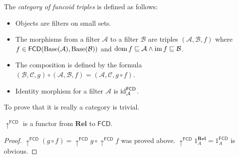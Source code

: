 The \emph{category of funcoid
triples} is defined as follows:
\begin{itemize}
\item Objects are filters on small sets.
\item The morphisms from a filter $\mathcal{A}$ to a filter $\mathcal{B}$
are triples $(\mathcal{A},\mathcal{B},f)$ where
$f\in\mathsf{FCD}(\operatorname{Base}(\mathcal{A}),\operatorname{Base}(\mathcal{B}))$
and $\operatorname{dom} f\sqsubseteq\mathcal{A}\land\operatorname{im} f\sqsubseteq\mathcal{B}$.
\item The composition is defined by the formula
$(\mathcal{B},\mathcal{C},g)\circ(\mathcal{A},\mathcal{B},f)=(\mathcal{A}
,\mathcal{C},g\circ f)$.
\item Identity morphism for a filter $\mathcal{A}$ is
$\operatorname{id}_{\mathcal{A}}^{\mathsf{FCD}}$.
\end{itemize}
To prove that it is really a category is trivial.
\begin{prop}
$\uparrow^{\mathsf{FCD}}$ is a functor from $\mathbf{Rel}$ to
$\mathsf{FCD}$.\end{prop}
\begin{proof}
$\uparrow^{\mathsf{FCD}}(g\circ
f)=\uparrow^{\mathsf{FCD}}g\circ\uparrow^{\mathsf{FCD}}f$
was proved above.
$\uparrow^{\mathsf{FCD}}1_{A}^{\mathbf{Rel}}=1_{A}^{\mathsf{FCD}}$
is obvious.
\end{proof}

